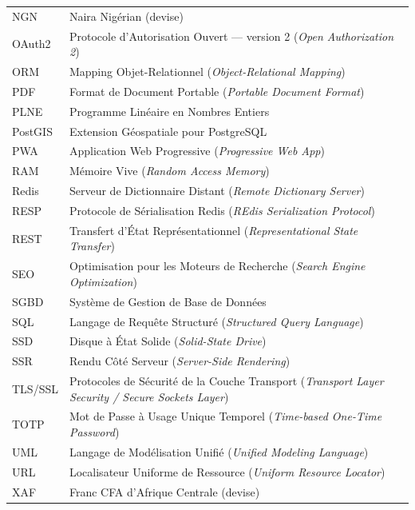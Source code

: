 \documentclass[12pt,a4paper]{report}
\begin{document}
\begin{longtable}{p{3.5cm} p{10.5cm}}
		NGN       & Naira Nigérian (devise) \\[4pt]
		OAuth2    & Protocole d'Autorisation Ouvert --- version 2 (\textit{Open Authorization 2}) \\[4pt]
		ORM       & Mapping Objet-Relationnel (\textit{Object-Relational Mapping}) \\[4pt]
		PDF       & Format de Document Portable (\textit{Portable Document Format}) \\[4pt]
		PLNE      & Programme Linéaire en Nombres Entiers \\[4pt]
		PostGIS   & Extension Géospatiale pour PostgreSQL \\[4pt]
		PWA       & Application Web Progressive (\textit{Progressive Web App}) \\[4pt]
		RAM       & Mémoire Vive (\textit{Random Access Memory}) \\[4pt]
		Redis     & Serveur de Dictionnaire Distant (\textit{Remote Dictionary Server}) \\[4pt]
		RESP      & Protocole de Sérialisation Redis (\textit{REdis Serialization Protocol}) \\[4pt]
		REST      & Transfert d'État Représentationnel (\textit{Representational State Transfer}) \\[4pt]
		SEO       & Optimisation pour les Moteurs de Recherche (\textit{Search Engine Optimization}) \\[4pt]
		SGBD      & Système de Gestion de Base de Données \\[4pt]
		SQL       & Langage de Requête Structuré (\textit{Structured Query Language}) \\[4pt]
		SSD       & Disque à État Solide (\textit{Solid-State Drive}) \\[4pt]
		SSR       & Rendu Côté Serveur (\textit{Server-Side Rendering}) \\[4pt]
		TLS/SSL   & Protocoles de Sécurité de la Couche Transport (\textit{Transport Layer Security / Secure Sockets Layer}) \\[4pt]
		TOTP      & Mot de Passe à Usage Unique Temporel (\textit{Time-based One-Time Password}) \\[4pt]
		UML       & Langage de Modélisation Unifié (\textit{Unified Modeling Language}) \\[4pt]
		URL       & Localisateur Uniforme de Ressource (\textit{Uniform Resource Locator}) \\[4pt]
		XAF       & Franc CFA d'Afrique Centrale (devise) \\[4pt]
		\bottomrule
	\end{longtable}
    
\end{document}

